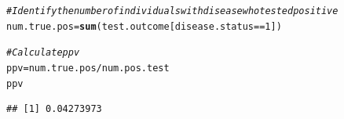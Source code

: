 \documentclass{report}\usepackage[]{graphicx}\usepackage[]{color}
\makeatletter
\newcommand{\hlnum}[1]{\textcolor[rgb]{0.686,0.059,0.569}{#1}}%
\newcommand{\hlcom}[1]{\textcolor[rgb]{0.678,0.584,0.686}{\textit{#1}}}%
\newcommand{\hlopt}[1]{\textcolor[rgb]{0,0,0}{#1}}%
\newcommand{\hlstd}[1]{\textcolor[rgb]{0.345,0.345,0.345}{#1}}%
\newcommand{\hlkwb}[1]{\textcolor[rgb]{0.69,0.353,0.396}{#1}}%
\newcommand{\hlkwd}[1]{\textcolor[rgb]{0.737,0.353,0.396}{\textbf{#1}}}%
\newenvironment{kframe}{%
 \def\at@end@of@kframe{}%
 \ifinner\ifhmode%
  \def\at@end@of@kframe{\end{minipage}}%
  \begin{minipage}{\columnwidth}%
 \fi\fi%
 \def\FrameCommand##1{\hskip\@totalleftmargin \hskip-\fboxsep
 \colorbox{shadecolor}{##1}\hskip-\fboxsep
     \hskip-\linewidth \hskip-\@totalleftmargin \hskip\columnwidth}%
 \MakeFramed {\advance\hsize-\width
   \@totalleftmargin\z@ \linewidth\hsize
   \@setminipage}}%
 {\par\unskip\endMakeFramed%
 \at@end@of@kframe}
\newenvironment{knitrout}{}{} %
\makeatother
\begin{document}
\begin{knitrout}
\begin{kframe}
\begin{alltt}
\hlcom{# Identify the number of individuals with disease who tested positive}
\hlstd{num.true.pos} \hlkwb{=} \hlkwd{sum}\hlstd{(test.outcome[disease.status} \hlopt{==} \hlnum{1}\hlstd{])}

\hlcom{# Calculate ppv}
\hlstd{ppv} \hlkwb{=} \hlstd{num.true.pos} \hlopt{/} \hlstd{num.pos.test}
\hlstd{ppv}
\end{alltt}
\begin{verbatim}
## [1] 0.04273973
\end{verbatim}
\end{kframe}
\end{knitrout}



%


\end{document}
